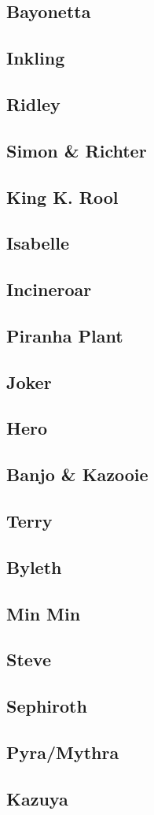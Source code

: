\begin{multicols}{2}
\subsection{Bayonetta}
\subsection{Inkling}
\subsection{Ridley}
\subsection{Simon \& Richter}
\subsection{King K. Rool}
\subsection{Isabelle}
\subsection{Incineroar}
\subsection{Piranha Plant}
\subsection{Joker}
\subsection{Hero}
\subsection{Banjo \& Kazooie}
\subsection{Terry}
\subsection{Byleth}
\subsection{Min Min}
\subsection{Steve}
\subsection{Sephiroth}
\subsection{Pyra/Mythra}
\subsection{Kazuya}

\end{multicols}
